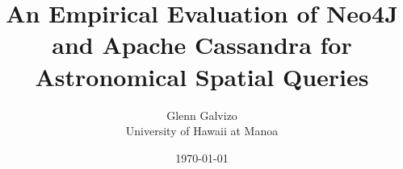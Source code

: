 \documentclass[conference]{IEEEtran}
\title{An Empirical Evaluation of Neo4J and Apache Cassandra for Astronomical Spatial Queries}
\author{Glenn Galvizo \\ University of Hawaii at Manoa} \date{\today}
\begin{document}
    \maketitle

    
    
    
    
    
    
    

    \nocite{*}
    
    
\end{document}
